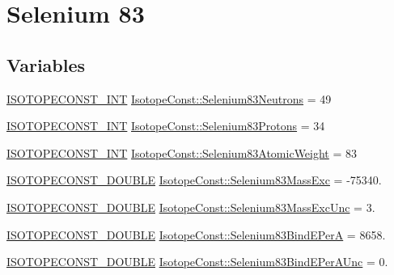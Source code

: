 \hypertarget{group___isotope_const-_selenium-_se83}{}\section{Selenium 83}
\label{group___isotope_const-_selenium-_se83}
\subsection*{Variables}
\begin{DoxyCompactItemize}
\item 
\mbox{\hyperlink{group___isotope_const-_macros_ga5f18360b3e99483a35c32d789e62621c}{I\+S\+O\+T\+O\+P\+E\+C\+O\+N\+S\+T\+\_\+\+I\+NT}} \mbox{\hyperlink{group___isotope_const-_selenium-_se83_ga85c926dd91fd992e26892ea1e2e30b2c}{Isotope\+Const\+::\+Selenium83\+Neutrons}} = 49
\item 
\mbox{\hyperlink{group___isotope_const-_macros_ga5f18360b3e99483a35c32d789e62621c}{I\+S\+O\+T\+O\+P\+E\+C\+O\+N\+S\+T\+\_\+\+I\+NT}} \mbox{\hyperlink{group___isotope_const-_selenium-_se83_ga5a88badc02eb6f6e29a8728022907545}{Isotope\+Const\+::\+Selenium83\+Protons}} = 34
\item 
\mbox{\hyperlink{group___isotope_const-_macros_ga5f18360b3e99483a35c32d789e62621c}{I\+S\+O\+T\+O\+P\+E\+C\+O\+N\+S\+T\+\_\+\+I\+NT}} \mbox{\hyperlink{group___isotope_const-_selenium-_se83_ga29042e0956302b087784bd9ae0b34c01}{Isotope\+Const\+::\+Selenium83\+Atomic\+Weight}} = 83
\item 
\mbox{\hyperlink{group___isotope_const-_macros_ga8f45a7272ce02c0b4c65c44636ed719a}{I\+S\+O\+T\+O\+P\+E\+C\+O\+N\+S\+T\+\_\+\+D\+O\+U\+B\+LE}} \mbox{\hyperlink{group___isotope_const-_selenium-_se83_ga52d84ae3ae4b31bd40b063fb2ecd815a}{Isotope\+Const\+::\+Selenium83\+Mass\+Exc}} = -\/75340.
\item 
\mbox{\hyperlink{group___isotope_const-_macros_ga8f45a7272ce02c0b4c65c44636ed719a}{I\+S\+O\+T\+O\+P\+E\+C\+O\+N\+S\+T\+\_\+\+D\+O\+U\+B\+LE}} \mbox{\hyperlink{group___isotope_const-_selenium-_se83_gaf73d7f5e787a381751eb379bee4894a1}{Isotope\+Const\+::\+Selenium83\+Mass\+Exc\+Unc}} = 3.
\item 
\mbox{\hyperlink{group___isotope_const-_macros_ga8f45a7272ce02c0b4c65c44636ed719a}{I\+S\+O\+T\+O\+P\+E\+C\+O\+N\+S\+T\+\_\+\+D\+O\+U\+B\+LE}} \mbox{\hyperlink{group___isotope_const-_selenium-_se83_ga116a6584ec9849f6f8fcdd33c87175b2}{Isotope\+Const\+::\+Selenium83\+Bind\+E\+PerA}} = 8658.
\item 
\mbox{\hyperlink{group___isotope_const-_macros_ga8f45a7272ce02c0b4c65c44636ed719a}{I\+S\+O\+T\+O\+P\+E\+C\+O\+N\+S\+T\+\_\+\+D\+O\+U\+B\+LE}} \mbox{\hyperlink{group___isotope_const-_selenium-_se83_gaf948394116c9279178c5b46d546c8d18}{Isotope\+Const\+::\+Selenium83\+Bind\+E\+Per\+A\+Unc}} = 0.

\end{DoxyCompactItemize}
